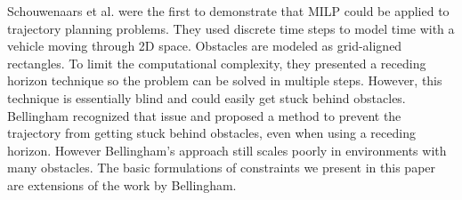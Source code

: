 Schouwenaars et al.\cite{Schouwenaars2001} were the first to demonstrate that MILP could be applied to trajectory planning problems. They used discrete time steps to model time with a vehicle moving through 2D space. Obstacles are modeled as grid-aligned rectangles. To limit the computational complexity, they presented a receding horizon technique so the problem can be solved in multiple steps. However, this technique is essentially blind and could easily get stuck behind obstacles. Bellingham\cite{Bellingham2002} recognized that issue and proposed a method to prevent the trajectory from getting stuck behind obstacles, even when using a receding horizon. However Bellingham's approach still scales poorly in environments with many obstacles. The basic formulations of constraints we present in this paper are extensions of the work by Bellingham.\\
